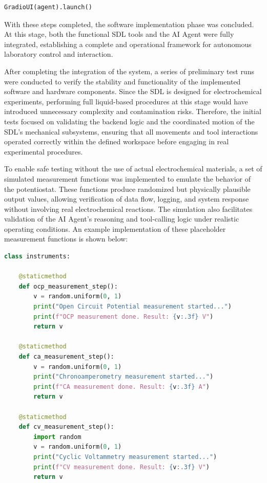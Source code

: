 \begin{lstlisting}[language=Python, caption={Launching GradioUI for a Chat Interface with a conventional UI}]
GradioUI(agent).launch()
\end{lstlisting}

With these steps completed, the software implementation phase was concluded. At this stage, both the functional SDL tools and the AI Agent were fully integrated, establishing a complete and operational framework for autonomous laboratory control and interaction.




After completing the integration of the system, a series of preliminary test runs were conducted to verify the stability and functionality of the implemented software and hardware components. Since the SDL is designed for electrochemical experiments, performing full liquid-based procedures at this stage would have introduced unnecessary complexity and contamination risks. Therefore, the initial tests focused on validating the backend logic and the coordinated motion of the SDL’s mechanical subsystems, ensuring that all movements and tool interactions operated correctly within the defined workspace before engaging in real experimental procedures.

To enable safe testing without the use of actual electrochemical materials, a set of simulated measurement functions was implemented to emulate the behavior of the potentiostat. These functions produce randomized but physically plausible output values, allowing verification of data flow, logging, and system response without involving real electrochemical reactions. The simulation also facilitates validation of the AI Agent’s reasoning and tool-calling logic under realistic operating conditions. An example implementation of these placeholder measurement functions is shown below:

\begin{lstlisting}[language=Python, caption={Simulated Measurement Functions}]
class instruments:

    @staticmethod
    def ocp_measurement_step():
        v = random.uniform(0, 1)
        print("Open Circuit Potential measurement started...")
        print(f"OCP measurement done. Result: {v:.3f} V")
        return v

    @staticmethod
    def ca_measurement_step():
        v = random.uniform(0, 1)
        print("Chronoamperometry measurement started...")
        print(f"CA measurement done. Result: {v:.3f} A")
        return v

    @staticmethod
    def cv_measurement_step():
        import random
        v = random.uniform(0, 1)
        print("Cyclic Voltammetry measurement started...")
        print(f"CV measurement done. Result: {v:.3f} V")
        return v
\end{lstlisting}

